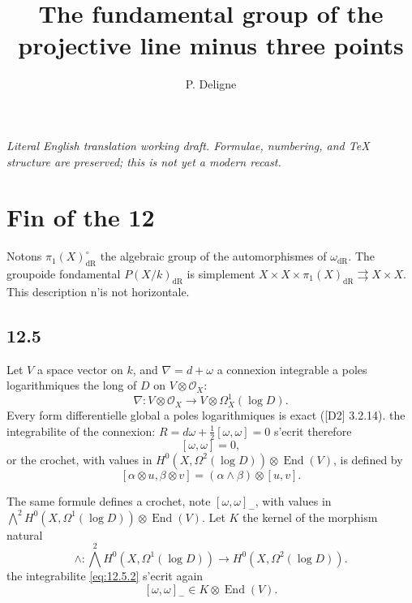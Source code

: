 \documentclass[12pt,a4paper]{article}
\title{The fundamental group of the projective line minus three points}
\author{P. Deligne}
\date{}
\theoremstyle{plain}
\theoremstyle{definition}
\theoremstyle{remark}
\DeclareMathOperator{\End}{End}
\newcommand{\cO}{\mathcal{O}}
\newcommand{\dr}{\mathrm{dR}}
\begin{document}
\begin{center}\small\emph{Literal English translation working draft. Formulae, numbering, and TeX structure are preserved; this is not yet a modern recast.}\end{center}
\vspace{0.5em}

\maketitle

\tableofcontents
\newpage

\section*{Fin of the 12}

Notons $\pi_1(X)_{\dr}^\circ$ the algebraic group of the automorphismes of $\omega_{\dr}$. The groupoide fondamental $P(X/k)_{\dr}$ is simplement $X \times X \times \pi_1(X)_{\dr} \rightrightarrows X \times X$. This description n'is not horizontale.

\subsection*{12.5}

Let $V$ a space vector on $k$, and $\nabla = d + \omega$ a connexion integrable a poles logarithmiques the long of $D$ on $V \otimes \cO_X$:
\begin{equation}\label{eq:12.5.1}
\nabla : V \otimes \cO_X \to V \otimes \Omega_X^1(\log D).
\end{equation}
Every form differentielle global a poles logarithmiques is exact ([D2] 3.2.14). the integrabilite of the connexion: $R = d\omega + \frac{1}{2}[\omega,\omega] = 0$ s'ecrit therefore
\begin{equation}\label{eq:12.5.2}
[\omega, \omega] = 0,
\end{equation}
or the crochet, with values in $H^0(X, \Omega^2(\log D)) \otimes \End(V)$, is defined by
\[
[\alpha \otimes u, \beta \otimes v] = (\alpha \wedge \beta) \otimes [u,v].
\]

The same formule defines a crochet, note $[\omega, \omega]_-$, with values in $\bigwedge^2 H^0(X, \Omega^1(\log D)) \otimes \End(V)$. Let $K$ the kernel of the morphism natural
\[
\wedge : \bigwedge^2 H^0(X, \Omega^1(\log D)) \to H^0(X, \Omega^2(\log D)).
\]
the integrabilite \eqref{eq:12.5.2} s'ecrit again
\begin{equation}\label{eq:12.5.3}
[\omega, \omega]_- \in K \otimes \End(V).
\end{equation}
\end{document}
